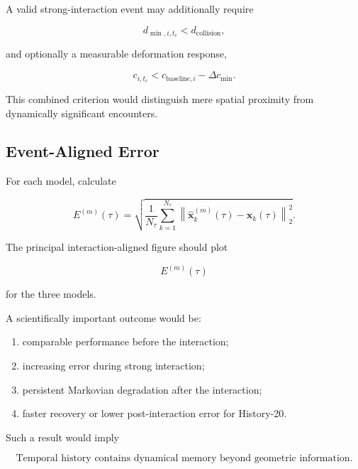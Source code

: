 \documentclass[11pt]{article}
\newcommand{\x}{\mathbf{x}}
\begin{document}
A valid strong-interaction event may additionally require

\begin{equation}
d_{\min,i,t_c}
<
d_{\mathrm{collision}},
\end{equation}

and optionally a measurable deformation response,

\begin{equation}
c_{i,t_c}
<
c_{\mathrm{baseline},i}
-
\Delta c_{\min}.
\end{equation}

This combined criterion would distinguish mere spatial proximity from dynamically significant encounters.

\subsection{Event-Aligned Error}

For each model, calculate

\begin{equation}
E^{(m)}(\tau)
=
\sqrt{
\frac{
1
}{
N_{\tau}
}
\sum_{k=1}^{N_{\tau}}
\left\|
\hat{\x}_{k}^{(m)}(\tau)
-
\x_k(\tau)
\right\|_2^2
}.
\end{equation}

The principal interaction-aligned figure should plot

\begin{equation}
E^{(m)}(\tau)
\end{equation}

for the three models.

A scientifically important outcome would be:

\begin{enumerate}
    \item comparable performance before the interaction;
    \item increasing error during strong interaction;
    \item persistent Markovian degradation after the interaction;
    \item faster recovery or lower post-interaction error for History-20.
\end{enumerate}

Such a result would imply

\begin{equation}
\boxed{
\text{Temporal history contains dynamical memory beyond geometric information.}
}
\end{equation}
\end{document}
